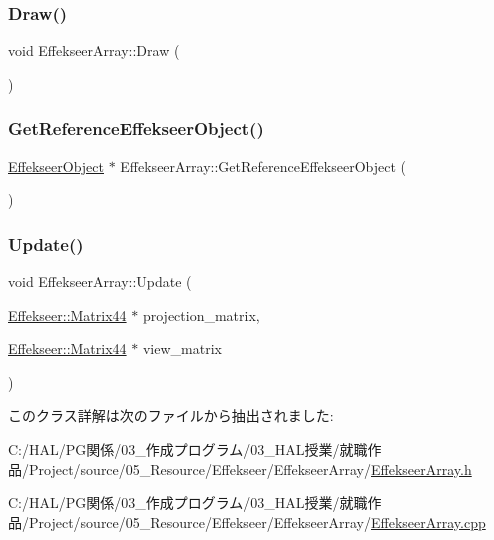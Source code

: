 \mbox{\label{class_effekseer_array_af915edc4a955bfc7927721a71016524d}} 
\subsubsection{\texorpdfstring{Draw()}{Draw()}}
{\footnotesize\ttfamily void Effekseer\+Array\+::\+Draw (\begin{DoxyParamCaption}{ }\end{DoxyParamCaption})}

\mbox{\label{class_effekseer_array_a0bbf7d610ef2219e3699d3f26182af03}} 
\subsubsection{\texorpdfstring{Get\+Reference\+Effekseer\+Object()}{GetReferenceEffekseerObject()}}
{\footnotesize\ttfamily \mbox{\hyperlink{class_effekseer_object}{Effekseer\+Object}} $\ast$ Effekseer\+Array\+::\+Get\+Reference\+Effekseer\+Object (\begin{DoxyParamCaption}{ }\end{DoxyParamCaption})}

\mbox{\label{class_effekseer_array_a41fcca7eb106c1c83851eca1284800f4}} 
\subsubsection{\texorpdfstring{Update()}{Update()}}
{\footnotesize\ttfamily void Effekseer\+Array\+::\+Update (\begin{DoxyParamCaption}\item[{\mbox{\hyperlink{struct_effekseer_1_1_matrix44}{Effekseer\+::\+Matrix44}} $\ast$}]{projection\+\_\+matrix,  }\item[{\mbox{\hyperlink{struct_effekseer_1_1_matrix44}{Effekseer\+::\+Matrix44}} $\ast$}]{view\+\_\+matrix }\end{DoxyParamCaption})}



このクラス詳解は次のファイルから抽出されました\+:\begin{DoxyCompactItemize}
\item 
C\+:/\+H\+A\+L/\+P\+G関係/03\+\_\+作成プログラム/03\+\_\+\+H\+A\+L授業/就職作品/\+Project/source/05\+\_\+\+Resource/\+Effekseer/\+Effekseer\+Array/\mbox{\hyperlink{_effekseer_array_8h}{Effekseer\+Array.\+h}}\item 
C\+:/\+H\+A\+L/\+P\+G関係/03\+\_\+作成プログラム/03\+\_\+\+H\+A\+L授業/就職作品/\+Project/source/05\+\_\+\+Resource/\+Effekseer/\+Effekseer\+Array/\mbox{\hyperlink{_effekseer_array_8cpp}{Effekseer\+Array.\+cpp}}\end{DoxyCompactItemize}
